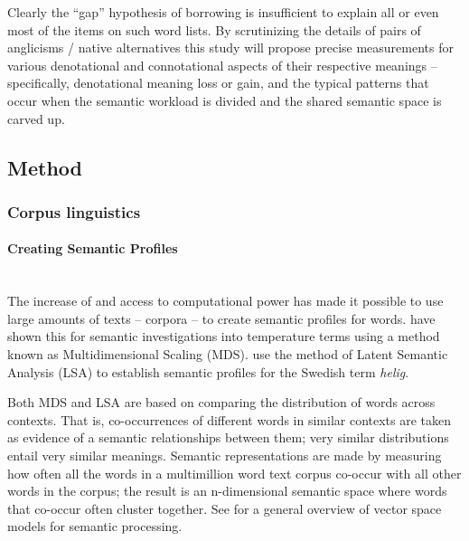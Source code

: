 \documentclass[a4paper]{article}
\begin{document}
Clearly the ``gap'' hypothesis of borrowing is insufficient to explain all or even most of the items on such word lists. 
By scrutinizing the details of pairs of anglicisms / native alternatives this study will propose precise measurements for various denotational and connotational aspects of their respective meanings -- specifically, denotational meaning loss or gain, and the typical patterns that occur when the semantic workload is divided and the shared semantic space is carved up.


\subsection{Method}


\subsubsection{Corpus linguistics}
%
\paragraph{Creating Semantic Profiles} \hspace{0pt} \\
The increase of and access to computational power has made it possible to use large amounts of texts -- corpora -- to create semantic profiles for words. 
\citet{Koptjevskaja-Tamm2013} have shown this for semantic investigations into temperature terms using a method known as Multidimensional Scaling (MDS). 
\citet{Sikstrom2012} use the method of Latent Semantic Analysis (LSA) to  establish semantic profiles for the Swedish term \textit{helig}. 

Both MDS and LSA are based on comparing the distribution of words across contexts. That is, co-occurrences of different words in similar contexts are taken as evidence of a semantic relationships between them; very similar distributions entail very similar meanings. 
Semantic representations are made by measuring how often all the words in a multimillion word text corpus co-occur with all other words in the corpus; the result is an n-dimensional semantic space where words that co-occur often cluster together. 
See \citet{Berry1999, Turney2010} for a general overview of vector space models for semantic processing. 
\end{document}
